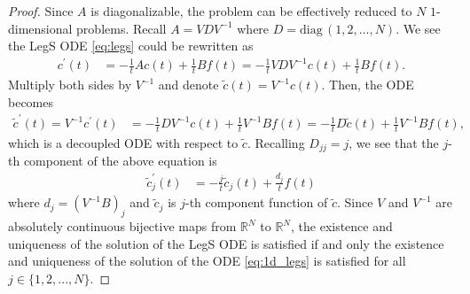 \documentclass[10pt,a4paper]{amsart}
\newcommand{\derivative}[1]{#1^{\prime}}
\begin{document}
\begin{proof}
    Since $A$ is diagonalizable, the problem can be effectively reduced to $N$ $1$-dimensional problems. 
    Recall $A = VDV^{-1}$ where $D=\mathrm{diag}\,(1,2,\dots,N)$. 
    We see the LegS ODE \eqref{eq:legs} could be rewritten as 
    \begin{align*}
        \derivative{c}(t) 
        &= -\frac{1}{t} A c(t) + \frac{1}{t} B f(t) %
        = -\frac{1}{t} VDV^{-1} c(t) + \frac{1}{t} B f(t). 
    \end{align*}
    Multiply both sides by $V^{-1}$ and denote $\tilde{c}(t) = V^{-1}c(t)$. Then, the ODE becomes
    \begin{align*}
        \derivative{\tilde{c}}(t) = V^{-1}\derivative{c}(t) &= -\frac{1}{t} D V^{-1} c(t) + \frac{1}{t} V^{-1}B f(t) = -\frac{1}{t} D\tilde{c}(t) + \frac{1}{t} V^{-1}B f(t),
    \end{align*}
    which is a decoupled ODE with respect to $\tilde{c}$. Recalling $D_{jj} = j$, we see that the $j$-th component of the above equation is
    \begin{align}   
        \derivative{\tilde{c}}_j(t)&= -\frac{j}{t}\tilde{c}_j(t) + \frac{d_j}{t} f(t) \label{eq:1d_legs}
    \end{align}
    where $d_j = (V^{-1}B)_j$ and $\tilde{c}_j$ is $j$-th component function of $\tilde{c}$. %
    Since $V$ and $V^{-1}$ are absolutely continuous bijective maps from $\mathbb{R}^N$ to $\mathbb{R}^N$, 
    the existence and uniqueness of the solution of the LegS ODE is satisfied if and only the existence and uniqueness of the solution of the ODE \eqref{eq:1d_legs} is satisfied for all 
    $j \in \{1, 2, ..., N\}$. 


\end{proof}
\end{document}
